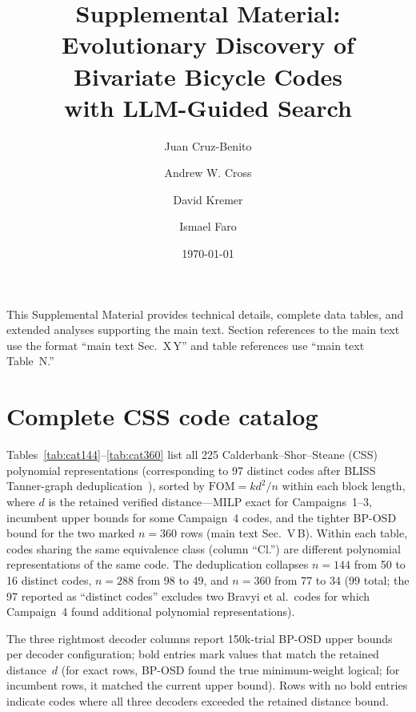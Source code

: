 \documentclass[aps,prxquantum,twocolumn,superscriptaddress,nofootinbib]{revtex4-2}
\newcommand{\FOM}{\ensuremath{\mathrm{FOM}}}
\begin{document}
\title{Supplemental Material:\\Evolutionary Discovery of Bivariate Bicycle Codes\\with LLM-Guided Search}

\author{Juan Cruz-Benito}
\author{Andrew W. Cross}
\author{David Kremer}
\author{Ismael Faro}

\date{\today}

\maketitle

\tableofcontents

This Supplemental Material provides technical details, complete data tables, and extended analyses supporting the main text.
Section references to the main text use the format ``main text Sec.~X\,Y'' and table references use ``main text Table~N.''

\section{Complete CSS code catalog}
\label{sm:css_catalog}

Tables~\ref{tab:cat144}--\ref{tab:cat360} list all 225 Calderbank--Shor--Steane (CSS)~\cite{calderbank1996good,steane1996multiple} polynomial representations (corresponding to 97 distinct codes after BLISS Tanner-graph deduplication~\cite{junttila2007engineering}), sorted by $\FOM = kd^2/n$ within each block length, where $d$ is the retained verified distance---MILP exact for Campaigns~1--3, incumbent upper bounds for some Campaign~4 codes, and the tighter BP-OSD bound for the two marked $n=360$ rows (main text Sec.~V\,B).
Within each table, codes sharing the same equivalence class (column ``Cl.'') are different polynomial representations of the same code.
The deduplication collapses $n = 144$ from 50 to 16 distinct codes, $n = 288$ from 98 to 49, and $n = 360$ from 77 to 34 (99 total; the 97 reported as ``distinct codes'' excludes two Bravyi et al.\ codes for which Campaign~4 found additional polynomial representations).

The three rightmost decoder columns report 150k-trial BP-OSD upper bounds per decoder configuration; bold entries mark values that match the retained distance~$d$ (for exact rows, BP-OSD found the true minimum-weight logical; for incumbent rows, it matched the current upper bound).
Rows with no bold entries indicate codes where all three decoders exceeded the retained distance bound.
\end{document}
